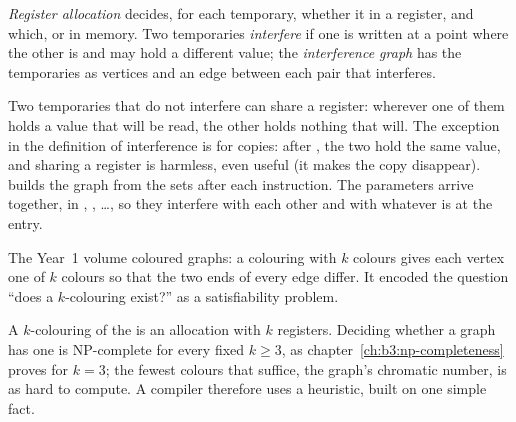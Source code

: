 \begin{definition}\label{def:b3:program-optimisation:regalloc}
\emph{Register allocation} decides, for each temporary, whether it  in a register, and which, or in memory. Two temporaries \emph{interfere} if one is written at a point where the other is  and may hold a different value; the \emph{interference graph} has the temporaries as vertices and an edge between each pair that interferes.
\end{definition}

Two temporaries that do not interfere can share a register: wherever one of them holds a value that will be read, the other holds nothing that will. The exception in the definition of interference is for copies: after , the two hold the same value, and sharing a register is harmless, even useful (it makes the copy disappear).  builds the graph from the  sets after each instruction. The parameters arrive together, in , , \dots, so they interfere with each other and with whatever is  at the entry.

\label{lst:b3:program-optimisation:interference}

\begin{recall}
The Year~1 volume coloured graphs: a colouring with $k$ colours gives each vertex one of $k$ colours so that the two ends of every edge differ. It encoded the question ``does a $k$-colouring exist?'' as a satisfiability problem.
\end{recall}

A $k$-colouring of the  is an allocation with $k$ registers. Deciding whether a graph has one is NP-complete for every fixed $k \ge 3$, as chapter~\ref{ch:b3:np-completeness} proves for $k = 3$; the fewest colours that suffice, the graph's chromatic number, is as hard to compute. A compiler therefore uses a heuristic, built on one simple fact.

